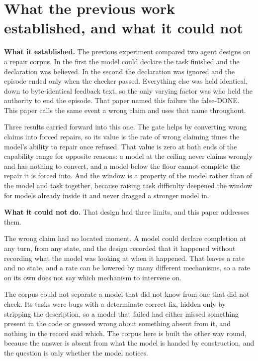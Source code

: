 \documentclass[11pt]{article}
\begin{document}
\section{What the previous work established, and what it could not}

\textbf{What it established.} The previous experiment compared two agent designs on a repair corpus. In the first the model could declare the task finished and the declaration was believed. In the second the declaration was ignored and the episode ended only when the checker passed. Everything else was held identical, down to byte-identical feedback text, so the only varying factor was who held the authority to end the episode. That paper named this failure the false-DONE. This paper calls the same event a wrong claim and uses that name throughout.

Three results carried forward into this one. The gate helps by converting wrong claims into forced repairs, so its value is the rate of wrong claiming times the model's ability to repair once refused. That value is zero at both ends of the capability range for opposite reasons: a model at the ceiling never claims wrongly and has nothing to convert, and a model below the floor cannot complete the repair it is forced into. And the window is a property of the model rather than of the model and task together, because raising task difficulty deepened the window for models already inside it and never dragged a stronger model in.

\textbf{What it could not do.} That design had three limits, and this paper addresses them.

The wrong claim had no located moment. A model could declare completion at any turn, from any state, and the design recorded that it happened without recording what the model was looking at when it happened. That leaves a rate and no state, and a rate can be lowered by many different mechanisms, so a rate on its own does not say which mechanism to intervene on.

The corpus could not separate a model that did not know from one that did not check. Its tasks were bugs with a determinate correct fix, hidden only by stripping the description, so a model that failed had either missed something present in the code or guessed wrong about something absent from it, and nothing in the record said which. The corpus here is built the other way round, because the answer is absent from what the model is handed by construction, and the question is only whether the model notices.
\end{document}
